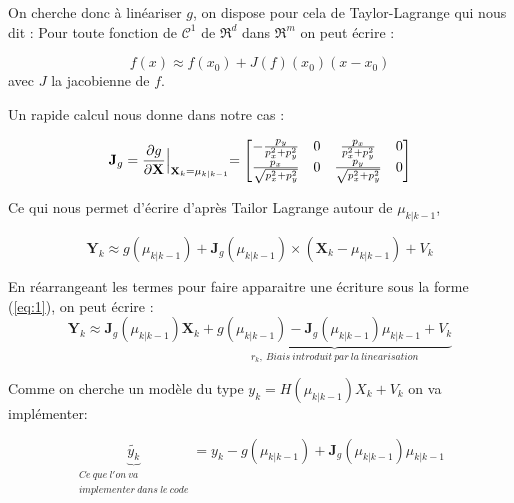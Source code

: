 On cherche donc à linéariser $g$, on dispose pour cela de Taylor-Lagrange qui nous dit :
Pour toute fonction de $\displaystyle \mathcal{C}^{1}$ de $\displaystyle \Re ^{d}$ dans $\displaystyle \Re ^{m}$ on peut écrire :

\begin{equation}
	f( x) \approx f( x_{0}) +J( f)( x_{0})( x-x_{0})
\end{equation}
avec $\displaystyle J$ la jacobienne de $\displaystyle f$.

Un rapide calcul nous donne dans notre cas :

\begin{equation}
	\mathbf{J}_{g} =\frac{\partial g}{\partial \mathbf{X}}\Bigl|_{\mathbf{X}_{k} =\mu _{k|k-1}} =\begin{bmatrix}
		-\frac{p_{y}}{p_{x}^{2} +p_{y}^{2}} & 0 & \frac{p_{x}}{p_{x}^{2} +p_{y}^{2}} & 0\\
		\frac{p_{x}}{\sqrt{p_{x}^{2} +p_{y}^{2}}} & 0 & \frac{p_{y}}{\sqrt{p_{x}^{2} +p_{y}^{2}}} & 0
	\end{bmatrix}
\end{equation}

Ce qui nous permet d'écrire d'après Tailor Lagrange autour de $\displaystyle \mu _{k|k-1}$,

\begin{equation}
	\mathbf{Y}_{k} \approx g( \mu _{k|k-1}) +\mathbf{J}_{g}( \mu _{k|k-1}) \times (\mathbf{X}_{k} -\mu _{k|k-1}) +V_{k}
\end{equation}

En réarrangeant les termes pour faire apparaitre une écriture sous la forme (\ref{eq:1}), on peut écrire :
\begin{equation}
	\mathbf{Y}_{k} \approx \mathbf{J}_{g}( \mu _{k|k-1})\mathbf{X}_{k} +\underbrace{g( \mu _{k|k-1}) -\mathbf{J}_{g}( \mu _{k|k-1}) \mu _{k|k-1} +V_{k}}_{r_{k} ,\ Biais\ introduit\ par\ la\ linearisation}
\end{equation}

Comme on cherche un modèle du type $\displaystyle y_{k} =H( \mu _{k|k-1}) X_{k} + V_{k}$ on va implémenter:

\begin{equation}
	\underbrace{\widetilde{y_{k}}}_{ \begin{array}{l}
			Ce\ que\ l'on\ va\ \\
			implementer\ dans\ le\ code
	\end{array}} =y_{k} -g( \mu _{k|k-1}) +\mathbf{J}_{g}( \mu _{k|k-1}) \mu _{k|k-1}
\end{equation}

